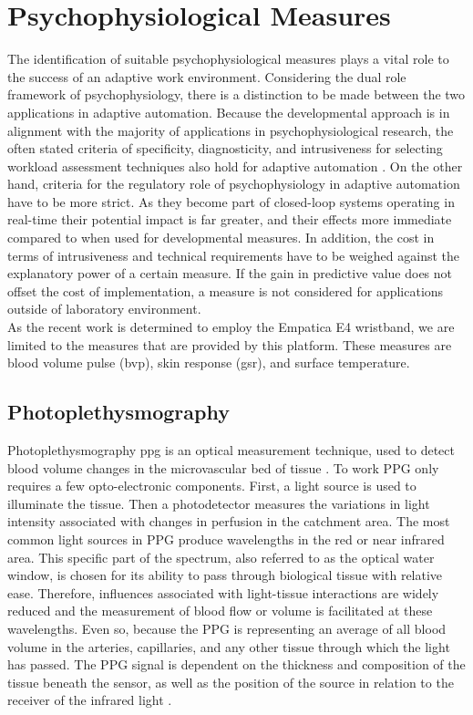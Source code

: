 \section{Psychophysiological Measures}
The identification of suitable psychophysiological measures plays a vital role to the success of an adaptive work environment. Considering the dual role framework of psychophysiology, there is a distinction to be made between the two applications in adaptive automation. Because the developmental approach is in alignment with the majority of applications in psychophysiological research, the often stated criteria of specificity, diagnosticity, and intrusiveness for selecting workload assessment techniques also hold for adaptive automation \cite{Byrne1996}. On the other hand, criteria for the regulatory role of psychophysiology in adaptive automation have to be more strict. As they become part of closed-loop systems operating in real-time their potential impact is far greater, and their effects more immediate compared to when used for developmental measures.  
In addition, the cost in terms of intrusiveness and technical requirements have to be weighed against the explanatory power of a certain measure. If the gain in predictive value does not offset the cost of implementation, a measure is not considered for applications outside of laboratory environment.\\
As the recent work is determined to employ the Empatica E4 wristband, we are limited to the measures that are provided by this platform. These measures are blood volume pulse (\gls{bvp}), skin response (\gls{gsr}), and surface temperature.

\subsection{Photoplethysmography}
Photoplethysmography \gls{ppg} is an optical measurement technique, used to detect blood volume changes in the microvascular bed of tissue \cite{Allan2007}. To work PPG only requires a few opto-electronic components. First, a light source is used to illuminate the tissue. Then a photodetector measures the variations in light intensity associated with changes in perfusion in the catchment area. 
The most common light sources in PPG produce wavelengths in the red or near infrared area. This specific part of the spectrum, also referred to as the optical water window, is chosen for its ability to pass through biological tissue with relative ease. Therefore, influences associated with light-tissue interactions are widely reduced and the measurement of blood flow or volume is facilitated at these wavelengths.
Even so, because the PPG is representing an average of all blood volume in the arteries, capillaries, and any other tissue through which the light has passed. The
PPG signal is dependent on the thickness and composition of the tissue beneath the sensor, as well as the position of the source in relation to the receiver of the infrared light \cite{Peper2007}.\\

